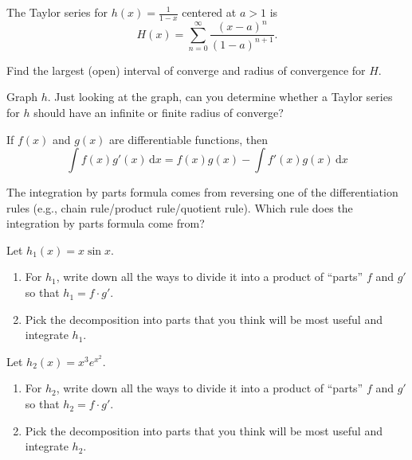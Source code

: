 \documentclass{workbook}
\begin{document}
\begin{slide}
	\question
	The Taylor series for $h(x)=\frac{1}{1-x}$ centered at $a>1$ is
	\[
		H(x)=\sum_{n=0}^\infty \frac{(x-a)^n}{(1-a)^{n+1}}.
	\]


	\begin{parts}
		\item Find the largest (open) interval of converge and radius of convergence for $H$.
		\item Graph $h$. Just looking at the graph, can you determine
		whether a Taylor series for $h$ should have an infinite or finite radius of converge?
	\end{parts}
\end{slide}



\begin{slide}
	\question

	\begin{theorem}
		If $f(x)$ and $g(x)$ are differentiable functions, then
		\[
			\int f(x)g'(x)\,\mathrm d x
			= f(x)g(x) -
			\int f'(x)g(x)\,\mathrm d x
		\]
	\end{theorem}

	\begin{parts}
		\item The integration by parts formula comes from reversing
		one of the differentiation rules (e.g., chain rule/product rule/quotient rule). Which rule does the integration by parts formula come from?
		\item
		Let $h_1(x)=x\sin x$.

		\begin{enumerate}
			\item
			      For $h_1$, write down all the ways to divide it into
			      a product of  ``parts'' $f$ and $g'$ so that $h_1=f\cdot g'$.
			\item Pick the decomposition into parts that you think will be most useful and integrate $h_1$.
		\end{enumerate}

		\item
		Let $h_2(x)=x^3 e^{x^2}$.
		\begin{enumerate}
			\item
			      For $h_2$, write down all the ways to divide it into
			      a product of  ``parts'' $f$ and $g'$ so that $h_2=f\cdot g'$.
			\item Pick the decomposition into parts that you think will be most useful and integrate $h_2$.
		\end{enumerate}

	\end{parts}
\end{slide}
\end{document}
